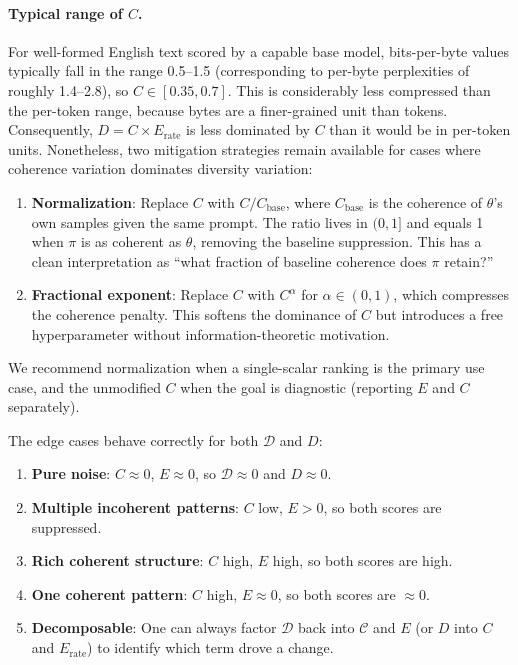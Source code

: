 \documentclass[11pt]{article}
\begin{document}
\paragraph{Typical range of $C$.} For well-formed English text scored by a capable base model, bits-per-byte values typically fall in the range 0.5--1.5 (corresponding to per-byte perplexities of roughly 1.4--2.8), so $C \in [0.35, 0.7]$. This is considerably less compressed than the per-token range, because bytes are a finer-grained unit than tokens. Consequently, $D = C \times E_{\mathrm{rate}}$ is less dominated by $C$ than it would be in per-token units. Nonetheless, two mitigation strategies remain available for cases where coherence variation dominates diversity variation:

\begin{enumerate}[nosep]
    \item \textbf{Normalization}: Replace $C$ with $C / C_{\mathrm{base}}$, where $C_{\mathrm{base}}$ is the coherence of $\theta$'s own samples given the same prompt. The ratio lives in $(0, 1]$ and equals 1 when $\pi$ is as coherent as $\theta$, removing the baseline suppression. This has a clean interpretation as ``what fraction of baseline coherence does $\pi$ retain?''
    \item \textbf{Fractional exponent}: Replace $C$ with $C^\alpha$ for $\alpha \in (0, 1)$, which compresses the coherence penalty. This softens the dominance of $C$ but introduces a free hyperparameter without information-theoretic motivation.
\end{enumerate}

We recommend normalization when a single-scalar ranking is the primary use case, and the unmodified $C$ when the goal is diagnostic (reporting $E$ and $C$ separately).

The edge cases behave correctly for both $\mathcal{D}$ and $D$:
\begin{enumerate}[nosep]
    \item \textbf{Pure noise}: $C \approx 0$, $E \approx 0$, so $\mathcal{D} \approx 0$ and $D \approx 0$.
    \item \textbf{Multiple incoherent patterns}: $C$ low, $E > 0$, so both scores are suppressed.
    \item \textbf{Rich coherent structure}: $C$ high, $E$ high, so both scores are high.
    \item \textbf{One coherent pattern}: $C$ high, $E \approx 0$, so both scores are $\approx 0$.
    \item \textbf{Decomposable}: One can always factor $\mathcal{D}$ back into $\mathcal{C}$ and $E$ (or $D$ into $C$ and $E_{\mathrm{rate}}$) to identify which term drove a change.
\end{enumerate}
\end{document}
